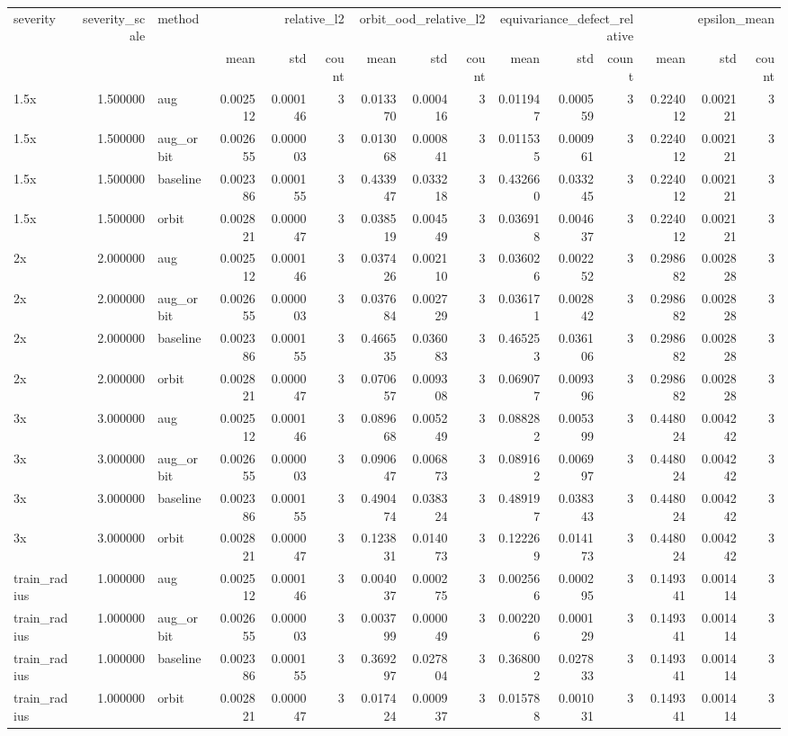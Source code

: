\begin{tabular}{lrlrrrrrrrrrrrr}
\toprule
severity & severity_scale & method & \multicolumn{3}{r}{relative_l2} & \multicolumn{3}{r}{orbit_ood_relative_l2} & \multicolumn{3}{r}{equivariance_defect_relative} & \multicolumn{3}{r}{epsilon_mean} \\
 &  &  & mean & std & count & mean & std & count & mean & std & count & mean & std & count \\
\midrule
1.5x & 1.500000 & aug & 0.002512 & 0.000146 & 3 & 0.013370 & 0.000416 & 3 & 0.011947 & 0.000559 & 3 & 0.224012 & 0.002121 & 3 \\
1.5x & 1.500000 & aug_orbit & 0.002655 & 0.000003 & 3 & 0.013068 & 0.000841 & 3 & 0.011535 & 0.000961 & 3 & 0.224012 & 0.002121 & 3 \\
1.5x & 1.500000 & baseline & 0.002386 & 0.000155 & 3 & 0.433947 & 0.033218 & 3 & 0.432660 & 0.033245 & 3 & 0.224012 & 0.002121 & 3 \\
1.5x & 1.500000 & orbit & 0.002821 & 0.000047 & 3 & 0.038519 & 0.004549 & 3 & 0.036918 & 0.004637 & 3 & 0.224012 & 0.002121 & 3 \\
2x & 2.000000 & aug & 0.002512 & 0.000146 & 3 & 0.037426 & 0.002110 & 3 & 0.036026 & 0.002252 & 3 & 0.298682 & 0.002828 & 3 \\
2x & 2.000000 & aug_orbit & 0.002655 & 0.000003 & 3 & 0.037684 & 0.002729 & 3 & 0.036171 & 0.002842 & 3 & 0.298682 & 0.002828 & 3 \\
2x & 2.000000 & baseline & 0.002386 & 0.000155 & 3 & 0.466535 & 0.036083 & 3 & 0.465253 & 0.036106 & 3 & 0.298682 & 0.002828 & 3 \\
2x & 2.000000 & orbit & 0.002821 & 0.000047 & 3 & 0.070657 & 0.009308 & 3 & 0.069077 & 0.009396 & 3 & 0.298682 & 0.002828 & 3 \\
3x & 3.000000 & aug & 0.002512 & 0.000146 & 3 & 0.089668 & 0.005249 & 3 & 0.088282 & 0.005399 & 3 & 0.448024 & 0.004242 & 3 \\
3x & 3.000000 & aug_orbit & 0.002655 & 0.000003 & 3 & 0.090647 & 0.006873 & 3 & 0.089162 & 0.006997 & 3 & 0.448024 & 0.004242 & 3 \\
3x & 3.000000 & baseline & 0.002386 & 0.000155 & 3 & 0.490474 & 0.038324 & 3 & 0.489197 & 0.038343 & 3 & 0.448024 & 0.004242 & 3 \\
3x & 3.000000 & orbit & 0.002821 & 0.000047 & 3 & 0.123831 & 0.014073 & 3 & 0.122269 & 0.014173 & 3 & 0.448024 & 0.004242 & 3 \\
train_radius & 1.000000 & aug & 0.002512 & 0.000146 & 3 & 0.004037 & 0.000275 & 3 & 0.002566 & 0.000295 & 3 & 0.149341 & 0.001414 & 3 \\
train_radius & 1.000000 & aug_orbit & 0.002655 & 0.000003 & 3 & 0.003799 & 0.000049 & 3 & 0.002206 & 0.000129 & 3 & 0.149341 & 0.001414 & 3 \\
train_radius & 1.000000 & baseline & 0.002386 & 0.000155 & 3 & 0.369297 & 0.027804 & 3 & 0.368002 & 0.027833 & 3 & 0.149341 & 0.001414 & 3 \\
train_radius & 1.000000 & orbit & 0.002821 & 0.000047 & 3 & 0.017424 & 0.000937 & 3 & 0.015788 & 0.001031 & 3 & 0.149341 & 0.001414 & 3 \\
\bottomrule
\end{tabular}
